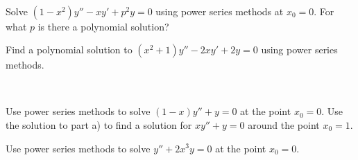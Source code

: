 \begin{exercise}
{\ }
\begin{tasks}
\task Solve $(1-x^2)y''-xy' + p^2y = 0$ using power series methods at $x_0=0$.
\task For what $p$ is there a polynomial solution?
\end{tasks}
\end{exercise}

\begin{exercise}
Find a polynomial solution to $(x^2+1) y''-2xy'+2y = 0$ using
power series methods.
\end{exercise}

\begin{exercise}
{\ }
\begin{tasks}
\task Use power series methods to solve $(1-x)y''+y = 0$ at the point $x_0 = 0$.
\task Use the solution to part a) to find a solution
for $xy''+y=0$ around the point $x_0=1$.
\end{tasks}
\end{exercise}

\setcounter{exercise}{100}

\begin{exercise}
Use power series methods to solve $y'' + 2 x^3 y = 0$ at the point $x_0 =
0$.
\end{exercise}


